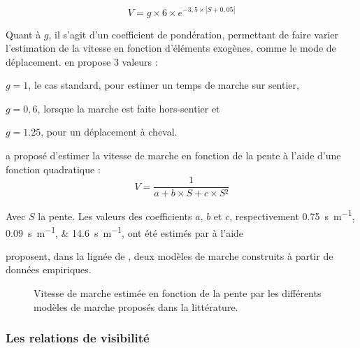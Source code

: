 \begin{equation}
  \label{eq:marche_tobler}
  V = g × 6 × e^{-3,5 × \left| S + 0,05 \right|}
\end{equation}

Quant à \(g\), il s'agit d'un coefficient de
pondération, permettant de faire varier l'estimation de la vitesse en
fonction d'éléments exogènes, comme le mode de
déplacement. \textcite{Tobler1993} en propose 3 valeurs :
%
\begin{enumerate*}[label=(\alph*)]
\item \(g = 1\), le cas standard, pour estimer un temps de marche sur
  sentier,
\item \(g = 0,6\), lorsque la marche est faite hors-sentier et
\item  \(g = 1.25\), pour un déplacement à cheval.
\end{enumerate*}

\textcite{Rees2004} a proposé d'estimer la vitesse de marche en
fonction de la pente à l'aide d'une fonction quadratique :
\begin{equation}
  V = \dfrac{1}{a + b × S + c × S²}
\end{equation}

Avec \(S\) la pente. Les valeurs des coefficients \(a\), \(b\) et
\(c\), respectivement \SIlist{0,75;0,09;14,6}{\second\per\meter}, ont
été estimés par \textcite{Rees2004} à l'aide

\textcite{Irmischer2017,Kerouanton2020} proposent, dans la lignée de
\textcite{Tobler1993}, deux modèles de marche construits à partir de
données empiriques.



\begin{figure}
  \caption{Vitesse de marche estimée en fonction de la pente par les
    différents modèles de marche proposés dans la littérature.}
  \label{fig:modeles_marche}
\end{figure}

\subsubsection{Les relations de visibilité}

